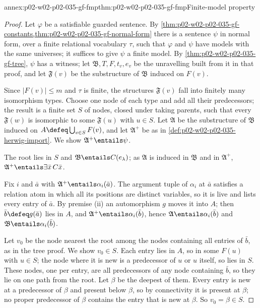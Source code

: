 \begin{annexitem}{annex:p02-w02-p02-035-gf-fmp}{thm:p02-w02-p02-035-gf-fmp}{Finite-model property}
\begin{proof}
Let \(\varphi\) be a satisfiable guarded sentence.  By
\cref{thm:p02-w02-p02-035-gf-constants,thm:p02-w02-p02-035-gf-normal-form}
there is a sentence \(\psi\) in normal form, over a finite relational
vocabulary \(\tau\), such that \(\varphi\) and \(\psi\) have models with the
same universes; it suffices to give \(\psi\) a finite model.  By
\cref{thm:p02-w02-p02-035-gf-tree}, \(\psi\) has a witness; let
\(\mathfrak B,T,F,t_v,e_v\) be the unravelling built from it in that proof,
and let \(\mathfrak F(v)\) be the substructure of \(\mathfrak B\) induced on
\(F(v)\).

Since \(\lvert F(v)\rvert\leq m\) and \(\tau\) is finite, the structures
\(\mathfrak F(v)\) fall into finitely many isomorphism types.  Choose one
node of each type and add all their predecessors; the result is a finite set
\(S\) of nodes, closed under taking parents, such that every \(\mathfrak F(w)\)
is isomorphic to some \(\mathfrak F(u)\) with \(u\in S\).  Let \(\mathfrak A\)
be the substructure of \(\mathfrak B\) induced on
\(A\defeq\bigcup_{v\in S}F(v)\), and let \(\mathfrak A^{+}\) be as in
\cref{def:p02-w02-p02-035-herwig-import}.  We show
\(\mathfrak A^{+}\entails\psi\).

The root lies in \(S\) and \(\mathfrak B\entails C(e_\lambda)\); as
\(\mathfrak A\) is induced in \(\mathfrak B\) and in \(\mathfrak A^{+}\),
\(\mathfrak A^{+}\entails\exists\bar x\,C\bar x\).

Fix \(i\) and \(\bar a\) with \(\mathfrak A^{+}\entails\alpha_i(\bar a)\).
The argument tuple of \(\alpha_i\) at \(\bar a\) satisfies a relation atom in
which all its positions are distinct variables, so it is live and lists every
entry of \(\bar a\).  By premise (ii) an automorphism \(g\) moves it into
\(A\); then \(\bar b\defeq g(\bar a)\) lies in \(A\), and
\(\mathfrak A^{+}\entails\alpha_i(\bar b)\), hence
\(\mathfrak A\entails\alpha_i(\bar b)\) and \(\mathfrak B\entails\alpha_i(\bar b)\).

Let \(v_0\) be the node nearest the root among the nodes containing all
entries of \(\bar b\), as in the tree proof.  We show \(v_0\in S\).  Each entry
lies in \(A\), so in some \(F(u)\) with \(u\in S\); the node where it is new
is a predecessor of \(u\) or \(u\) itself, so lies in \(S\).  These nodes,
one per entry, are all predecessors of any node containing \(\bar b\), so
they lie on one path from the root.  Let \(\beta\) be the deepest of them.
Every entry is new at a predecessor of \(\beta\) and present below \(\beta\),
so by connectivity it is present at \(\beta\); no proper predecessor of
\(\beta\) contains the entry that is new at \(\beta\).  So \(v_0=\beta\in S\).


\end{proof}
\end{annexitem}
